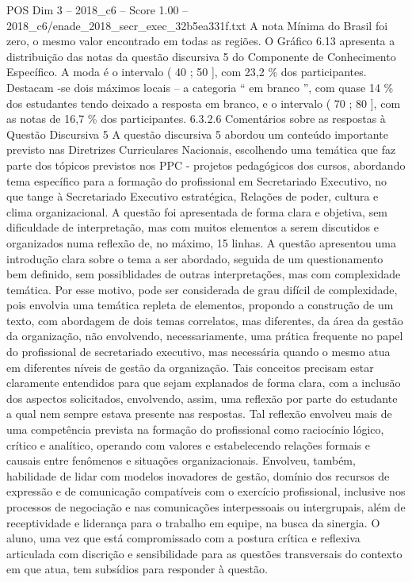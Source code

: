 \begin{textsample}{POS Dim 3 – 2018\_c6 – Score 1.00 – 2018\_c6/enade\_2018\_secr\_exec\_32b5ea331f.txt}
A nota Mínima do Brasil foi zero, o mesmo valor encontrado em todas as regiões.
O Gráfico 6.13 apresenta a distribuição das notas da questão discursiva 5 do Componente de Conhecimento Específico.
A moda é o intervalo ( 40 ; 50 ], com 23,2 \% dos participantes.
Destacam -se dois máximos locais – a categoria “ em branco ”, com quase 14 \% dos estudantes tendo deixado a resposta em branco, e o intervalo ( 70 ; 80 ], com as notas de 16,7 \% dos participantes. 6.3.2.6 Comentários sobre as respostas à Questão Discursiva 5 A questão discursiva 5 abordou um conteúdo importante previsto nas Diretrizes Curriculares Nacionais, escolhendo uma temática que faz parte dos tópicos previstos nos PPC - projetos pedagógicos dos cursos, abordando tema específico para a formação do profissional em Secretariado Executivo, no que tange à Secretariado Executivo estratégica, Relações de poder, cultura e clima organizacional.
A questão foi apresentada de forma clara e objetiva, sem dificuldade de interpretação, mas com muitos elementos a serem discutidos e organizados numa reflexão de, no máximo, 15 linhas.
A questão apresentou uma introdução clara sobre o tema a ser abordado, seguida de um questionamento bem definido, sem possiblidades de outras interpretações, mas com complexidade temática.
Por esse motivo, pode ser considerada de grau difícil de complexidade, pois envolvia uma temática repleta de elementos, propondo a construção de um texto, com abordagem de dois temas correlatos, mas diferentes, da área da gestão da organização, não envolvendo, necessariamente, uma prática frequente no papel do profissional de secretariado executivo, mas necessária quando o mesmo atua em diferentes níveis de gestão da organização.
Tais conceitos precisam estar claramente entendidos para que sejam explanados de forma clara, com a inclusão dos aspectos solicitados, envolvendo, assim, uma reflexão por parte do estudante a qual nem sempre estava presente nas respostas.
Tal reflexão envolveu mais de uma competência prevista na formação do profissional como raciocínio lógico, crítico e analítico, operando com valores e estabelecendo relações formais e causais entre fenômenos e situações organizacionais.
Envolveu, também, habilidade de lidar com modelos inovadores de gestão, domínio dos recursos de expressão e de comunicação compatíveis com o exercício profissional, inclusive nos processos de negociação e nas comunicações interpessoais ou intergrupais, além de receptividade e liderança para o trabalho em equipe, na busca da sinergia.
O aluno, uma vez que está compromissado com a postura crítica e reflexiva articulada com discrição e sensibilidade para as questões transversais do contexto em que atua, tem subsídios para responder à questão.

\end{textsample}
